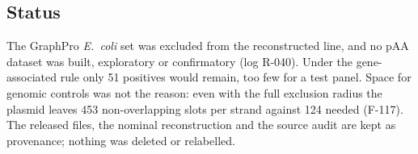 \subsection{Status}

The GraphPro \textit{E.~coli} set was excluded from the reconstructed line, and
no pAA dataset was built, exploratory or confirmatory (log R-040). Under the
gene-associated rule only 51 positives would remain, too few for a test panel.
Space for genomic controls was not the reason: even with the full exclusion
radius the plasmid leaves 453 non-overlapping slots per strand against 124
needed (F-117). The released files, the nominal reconstruction and the source
audit are kept as provenance; nothing was deleted or relabelled.
